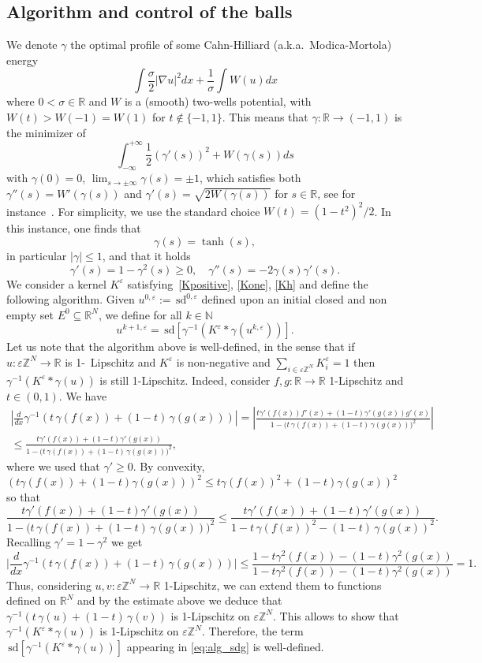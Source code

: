 \documentclass[10pt]{amsart}
\theoremstyle{plain}
\theoremstyle{definition}
\newcommand{\R}{\mathbb{R}}
\newcommand{\Z}{\mathbb{Z}}
\newcommand{\N}{\mathbb{N}}
\newcommand{\g}{\gamma}
\newcommand{\e}{\varepsilon}
\newcommand{\sd}{\,\mathrm{sd}}
\newcommand{\ez}{\e\Z^N}
\numberwithin{equation}{section}
\begin{document}
\subsection{Algorithm and control of the balls}
We denote $\gamma$  the optimal profile of some Cahn-Hilliard (a.k.a.~Modica-Mortola) energy
\[
\int \frac\sigma2 |\nabla u|^2dx + \frac{1}{\sigma}\int W(u)dx
\]
where $0<\sigma\in\R$ and  $W$ is a (smooth) two-wells potential, with $W(t)>W(-1)=W(1)$ for $t\not\in\{-1,1\}$. This means
that $\gamma: \R\to (-1,1)$ is the minimizer of
\[
\int_{-\infty}^{+\infty} \frac 12  (\gamma'(s))^2 + W(\gamma(s)) ds
\]
with $\gamma(0)=0$, $\lim_{s\to\pm \infty}\gamma(s)=\pm 1$, which satisfies both $\gamma''(s) = W'(\gamma(s))$ and $ \gamma'(s) =\sqrt{2W(\gamma(s))}$ 
for $s\in\R$,
see for instance~\cite{Alberti96}.  For
simplicity, we use the standard choice $W(t)=(1-t^2)^2/2$. In this instance, one finds that 
\[
\g(s)=\tanh(s),
\]
  {in particular $|\gamma|\le 1$,} and that it holds
\[
\g'(s) = 1-\g^2(s)\ge 0, \quad \g''(s)=-2\g(s)\g'(s).
\] 
We   consider a kernel $K^\e$ satisfying~\eqref{Kpositive}, \eqref{Kone}, \eqref{Kh} and define 
the following algorithm. Given
$u^{0,\e}:=\sd^{0,\e}$ defined upon an initial closed   {and non empty} set $E^0\subseteq \R^N$, we define for all $k\in\N$
\begin{equation}\label{eq:alg_sdg}
    u^{k+1,\e}=\sd[\gamma^{-1}(K^\e\ast \gamma(u^{k,\e}))].
\end{equation}
Let us note that the algorithm above is well-defined, in the sense that if $u:\ez\to \R$ is 1-~Lipschitz and $K^\e$ is non-negative and $\sum_{i\in\ez}K^\e_i=1$ then $\g^{-1}(K^\e\ast \g(u))$ is still 1-Lipschitz. Indeed, consider $f,g:\R\to \R$ 1-Lipschitz and $t\in(0,1)$. We have 
\begin{multline*}
    \left\lvert \frac d{dx}\g^{-1}(t\,\g(f(x))+(1-t)\,\g(g(x)))  \right \rvert =\left \lvert \frac{t\g'(f(x))f'(x)+(1-t)\g'(g(x))g'(x)}{1-\big(t\,\g(f(x))+(1-t)\,\g(g(x))\big)^2}\right\rvert \\[1.5ex]
    \le \frac{t\g'(f(x))+(1-t)\g'(g(x))}{1-\big(t\,\g(f(x))+(1-t)\,\g(g(x))\big)^2},
\end{multline*}
where we used that $\g'\ge 0$. By convexity,
$(t\g(f(x))+(1-t)\g(g(x)))^2
\le t\g(f(x))^2+(1-t)\g(g(x))^2$ so that
\[
\frac{t\g'(f(x))+(1-t)\g'(g(x))}{1-\big(t\,\g(f(x))+(1-t)\,\g(g(x))\big)^2}
\le
\frac{t\g'(f(x))+(1-t)\g'(g(x))}{1-t\,\g(f(x))^2-(1-t)\,\g(g(x))^2}.
\]
Recalling $\g'=1-\g^2$ we get 
\[
 \Big \lvert\frac d{dx}\g^{-1}(t\,\g(f(x))+(1-t)\,\g(g(x)))\Big \lvert\le  \frac{1 -t\g^2(f(x))-(1-t)\g^2(g(x))}{1-t\g^2(f(x))-(1-t)\g^2(g(x))}=1.
\]
Thus, considering $u,v:\ez\to \R$ 1-Lipschitz,  we can extend them to functions defined on $\R^N$ and by the estimate above   we deduce that $\g^{-1}(t\,\g(u)+(1-t)\,\g(v))$
is 1-Lipschitz on $\ez$. This allows to show that $\g^{-1}(K^\e\ast \g(u))$ is 1-Lipschitz on $\ez$.  Therefore, the term $\sd[\g^{-1}(K^\e\ast \g(u))]$ appearing in \eqref{eq:alg_sdg} is well-defined. 
\end{document}

